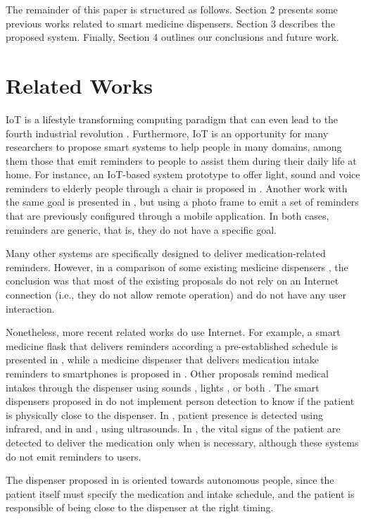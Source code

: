 \documentclass{IOS-Book-Article}
\begin{document}
The remainder of this paper is structured as follows. Section 2 presents some previous works related to smart medicine dispensers. Section 3 describes the proposed system. Finally, Section 4 outlines our conclusions and future work.

\section{Related Works}

IoT is a lifestyle transforming computing paradigm \cite{r11} that can even lead to the fourth industrial revolution \cite{r12,r13}. Furthermore, IoT is an opportunity for many researchers to propose smart systems to help people in many domains, among them those that emit reminders to people to assist them during their daily life at home.
For instance, an IoT-based system prototype to offer light, sound and voice reminders to elderly people through a chair is proposed in \cite{r6}. Another work with the same goal is presented in \cite{r14}, but using a photo frame to emit a set of reminders that are previously configured through a mobile application. In both cases, reminders are generic, that is, they do not have a specific goal.

Many other systems are specifically designed to deliver medication-related reminders. However, in a comparison of some existing medicine dispensers \cite{r8}, the conclusion was that most of the existing proposals do not rely on an Internet connection (i.e., they do not allow remote operation) and do not have any user interaction.

Nonetheless, more recent related works do use Internet. For example, a smart medicine flask that delivers reminders according a pre-established schedule is presented in \cite{r15}, while a medicine dispenser that delivers medication intake reminders to smartphones is proposed in \cite{r16}. Other proposals remind medical intakes through the dispenser using sounds \cite{r16,r17,r18}, lights \cite{r19,r20}, or both \cite{r21,r15}. The smart dispensers proposed in \cite{r7,r9,r15,r16,r20,r21} do not implement person detection to know if the patient is physically close to the dispenser. In \cite{r17}, patient presence is detected using infrared, and in \cite{r22} and \cite{r19}, using ultrasounds. In \cite{r7,r9}, the vital signs of the patient are detected to deliver the medication only when is necessary, although these systems do not emit reminders to users. 

The dispenser proposed in \cite{r22} is oriented towards autonomous people, since the patient itself must specify the medication and intake schedule, and the patient is responsible of being close to the dispenser at the right timing.
\end{document}
